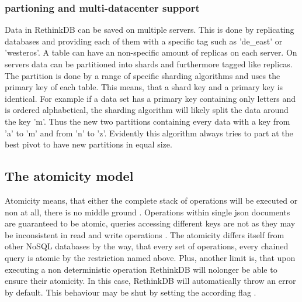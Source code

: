 \subsubsection{partioning and multi-datacenter support}

Data in RethinkDB can be saved on multiple servers. This is done by replicating databases and providing each of them with a specific tag such as 'de\_east' or 'westeros'. A table can have an non-specific amount of replicas on each server. 
On servers data can be partitioned into shards and furthermore tagged like replicas.  The partition is done by a range of specific sharding algorithms and uses the primary key of each table. This means, that a shard key and a primary key is identical. For example if a data set has a primary key containing only letters and is ordered alphabetical, the sharding algorithm will likely split the data around the key 'm'. Thus the new two partitions containing every data with a key from 'a' to 'm' and from 'n' to 'z'. Evidently this algorithm always tries to part at the best pivot to have new partitions in equal size.\cite["How does multidata-center support work"]{RethinkSharding}

\subsection{The atomicity model}
\label{atomicity}
Atomicity means, that either the complete stack of operations will be executed or non at all, there is no middle ground \cite{TechTargetAcid}.
Operations within single json documents are guaranteed to be atomic, queries accessing different keys are not as they may be inconsistent in read and write operations \cite{jepsen2016}.
The atomicity differs itself from other NoSQL databases by the way, that every set of operations, every chained query is atomic by the restriction named above. Plus, another limit is, that upon executing a non deterministic operation RethinkDB will nolonger be able to ensure their atomicity. In this case, RethinkDB will automatically throw an error by default. This behaviour may be shut by setting the according flag \cite["How does atomicity work"]{RethinkQE}.  

